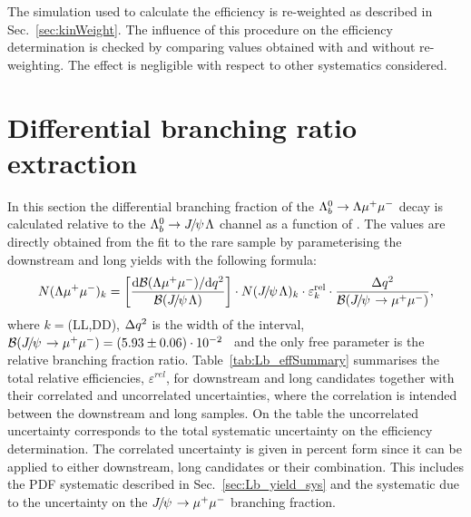 The simulation used to calculate the efficiency is re-weighted as described in Sec.~\ref{sec:kinWeight}.
The influence of this procedure on the efficiency determination is checked by comparing values obtained with
and without re-weighting. The effect is negligible with respect to other systematics considered.



\section{Differential branching ratio extraction}
\label{sec:Lb_BRsummary}

In this section the differential branching fraction of the $\Lambda^0_b\rightarrow\Lambda\mu^+\mu^-$ decay is calculated 
relative to the $\Lb\ra\jpsi\Lz$ channel as a function of \qsq.
The values are directly obtained from the fit to the rare sample by parameterising
the downstream and long yields with the following formula:
%
\begin{equation}
N(\Lz\mumu)_{k}  = \left[ \frac{\mathrm{d}\mathcal{B}(\Lz\mumu)/\mathrm{d}\qsq}{\mathcal{B}(\jpsi\Lz)} \right]  \cdot
N(\jpsi\Lz)_{k} \cdot \varepsilon^{\mathrm{rel}}_{k} \cdot \frac {\Delta\qsq} { \mathcal{B}(\jpsi\to\mumu) },
\label{eq:ield_from_BR}
\end{equation}
\noindent
where $k = $(LL,DD), $\Delta q^2$ is the width of the \qsq interval, 
\mbox{$\mathcal{B}(\jpsi\to\mumu) = (5.93 \pm 0.06)\cdot 10^{-2}$~\cite{PDG2014}} and the only free parameter
is the relative branching fraction ratio. Table~\ref{tab:Lb_effSummary} summarises the total relative efficiencies, 
$\varepsilon^{rel}$, for downstream and long candidates together with their correlated and uncorrelated uncertainties, 
where the correlation is intended between the downstream and long  samples. On the table the uncorrelated uncertainty 
corresponds to the total systematic uncertainty on the efficiency determination.
The correlated uncertainty is given in percent form since it can be applied to either downstream, long candidates 
or their combination. This includes the PDF systematic described in Sec.~\ref{sec:Lb_yield_sys} and the systematic 
due to the uncertainty on the $\jpsi\to\mumu$ branching fraction.

